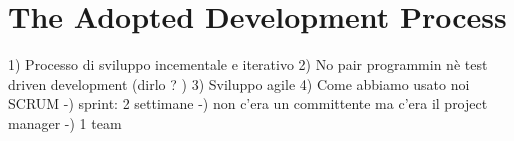 			
			
	
	
	\section{The Adopted Development Process}
		1) Processo di sviluppo incementale e iterativo
		2) No pair programmin nè test driven development  (dirlo ? )
		3) Sviluppo agile
		4) Come abbiamo usato noi SCRUM
			-) sprint: 2 settimane
			-) non c'era un committente ma c'era il project manager
			-) 1 team

